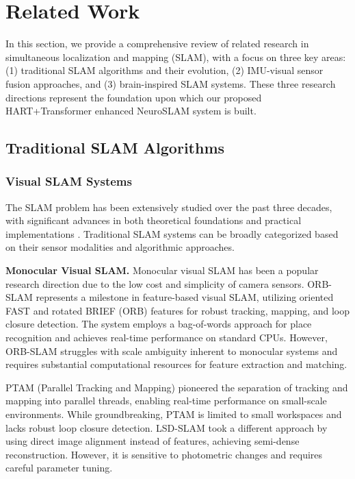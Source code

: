 \section{Related Work}

In this section, we provide a comprehensive review of related research in simultaneous localization and mapping (SLAM), with a focus on three key areas: (1) traditional SLAM algorithms and their evolution, (2) IMU-visual sensor fusion approaches, and (3) brain-inspired SLAM systems. These three research directions represent the foundation upon which our proposed HART+Transformer enhanced NeuroSLAM system is built.

\subsection{Traditional SLAM Algorithms}

\subsubsection{Visual SLAM Systems}

The SLAM problem has been extensively studied over the past three decades, with significant advances in both theoretical foundations and practical implementations \cite{Cadena2016}. Traditional SLAM systems can be broadly categorized based on their sensor modalities and algorithmic approaches.

\textbf{Monocular Visual SLAM.} 
Monocular visual SLAM has been a popular research direction due to the low cost and simplicity of camera sensors. 
ORB-SLAM \cite{MurArtal2015, MurArtal2017} represents a milestone in feature-based visual SLAM, utilizing oriented FAST and rotated BRIEF (ORB) features for robust tracking, mapping, and loop closure detection. 
The system employs a bag-of-words approach for place recognition and achieves real-time performance on standard CPUs. 
However, ORB-SLAM struggles with scale ambiguity inherent to monocular systems and requires substantial computational resources for feature extraction and matching.

PTAM (Parallel Tracking and Mapping) \cite{Klein2007} pioneered the separation of tracking and mapping into parallel threads, enabling real-time performance on small-scale environments. 
While groundbreaking, PTAM is limited to small workspaces and lacks robust loop closure detection.
LSD-SLAM \cite{Engel2014} took a different approach by using direct image alignment instead of features, achieving semi-dense reconstruction. 
However, it is sensitive to photometric changes and requires careful parameter tuning.

